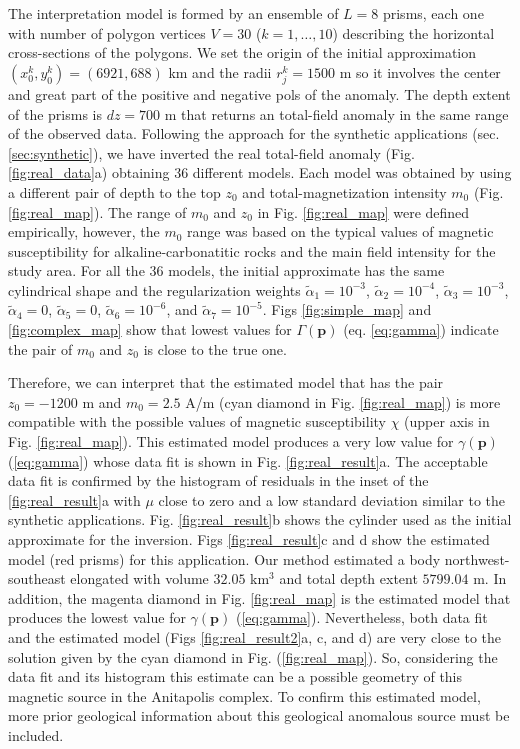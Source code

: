 The interpretation model is formed by an ensemble of $L = 8$ prisms, each one with number of polygon vertices $V = 30$ ($k = 1, \dots , 10$) describing the horizontal cross-sections of the polygons. We set the origin of the initial approximation $(x_0^k, y_0^k) = (6921, 688)$ km and the radii $r_j^k = 1500$ m so it involves the center and great part of the positive and negative pols of the anomaly. The depth extent of the prisms is $dz = 700$ m that returns an total-field anomaly in the same range of the observed data. Following the approach for the synthetic applications (sec. \ref{sec:synthetic}), we have inverted the real total-field anomaly (Fig. \ref{fig:real_data}a) obtaining 36 different models. Each model was obtained by using a different pair of depth to the top $z_0$ and total-magnetization intensity $m_0$ (Fig. \ref{fig:real_map}). The range of $m_0$ and $z_0$ in Fig. \ref{fig:real_map} were defined empirically, however, the $m_0$ range was based on the typical values of magnetic susceptibility for alkaline-carbonatitic rocks and the main field intensity for the study area. For all the 36 models, the initial approximate has the same cylindrical shape and the regularization weights $\tilde{\alpha}_1 = 10^{-3}$, $\tilde{\alpha}_2 = 10^{-4}$, $\tilde{\alpha}_3 = 10^{-3}$, $\tilde{\alpha}_4 = 0$, $\tilde{\alpha}_5 = 0$, $\tilde{\alpha}_6 = 10^{-6}$, and $\tilde{\alpha}_7 = 10^{-5}$. Figs \ref{fig:simple_map} and \ref{fig:complex_map} show that lowest values for $\Gamma(\mathbf{p})$ (eq. \ref{eq:gamma}) indicate the pair of $m_0$ and $z_0$ is close to the true one.

Therefore, we can interpret that the estimated model that has the pair $z_0 = -1200$ m and $m_0 = 2.5$ A/m (cyan diamond in Fig. \ref{fig:real_map}) is more compatible with the possible values of magnetic susceptibility $ \chi $ (upper axis in Fig. \ref{fig:real_map}). This estimated model produces a very low value for $ \gamma(\mathbf{p}) $ (\ref{eq:gamma}) whose data fit is shown in Fig. \ref{fig:real_result}a. The acceptable data fit is confirmed by the histogram of residuals in the inset of the \ref{fig:real_result}a with $ \mu $ close to zero and a low standard deviation similar to the synthetic applications. Fig. \ref{fig:real_result}b shows the cylinder used as the initial approximate for the inversion. Figs \ref{fig:real_result}c and d show the estimated model (red prisms) for this application. Our method estimated a body northwest-southeast elongated with volume $ 32.05 $ km$ ^3 $ and total depth extent $ 5799.04 $ m. In addition, the magenta diamond in Fig. \ref{fig:real_map} is the estimated model that produces the lowest value for $ \gamma(\mathbf{p}) $ (\ref{eq:gamma}). Nevertheless, both data fit and the estimated model (Figs \ref{fig:real_result2}a, c, and d) are very close to the solution given by the cyan diamond in Fig. (\ref{fig:real_map}). So, considering the data fit and its histogram this estimate can be a possible geometry of this magnetic source in the Anitapolis complex. To confirm this estimated model, more prior geological information about this geological anomalous source must be included.